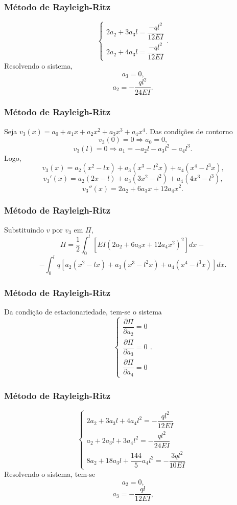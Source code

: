 \documentclass{beamer}
\begin{document}
	\begin{frame}
		\frametitle{Método de Rayleigh-Ritz}
		\justify
		
		$$
			\begin{cases}
				2a_2+3a_3l=\dfrac{-ql^2}{12EI}\\[10pt]
				2a_2+4a_3l=\dfrac{-ql^2}{12EI}
			\end{cases}
			\text{.}
		$$
		\pause
		Resolvendo o sistema,
		$$
			a_3=0
			\text{,}
		$$
		\pause
		$$
			a_2=-\frac{ql^2}{24EI}
			\text{.}
		$$
	\end{frame}
	
	\begin{frame}
		\frametitle{Método de Rayleigh-Ritz}
		\justify
		
		Seja $v_3(x)=a_0 + a_1 x + a_2 x^2 + a_3 x^3 + a_4 x^4$. \pause Das condições de contorno
		$$
			v_3(0)=0\Longrightarrow a_0 = 0\text{,}
		$$
		\pause
		$$
			v_3(l)=0\Longrightarrow a_1 = -a_2l - a_3l^2 - a_4l^3\text{.}
		$$
		\pause
		Logo, 
		$$v_3(x)=a_2(x^2-lx)+a_3(x^3-l^2x) + a_4(x^4-l^3x)\text{,}$$
		\pause 
		$$v_3'(x)=a_2(2x-l)+a_3(3x^2-l^2)+a_4(4x^3-l^3)\text{,}$$
		\pause
		$$v_3''(x)=2a_2 + 6a_3x + 12a_4x^2\text{.}$$
	\end{frame}
	
	\begin{frame}
		\frametitle{Método de Rayleigh-Ritz}
		\justify
		
		Substituindo $v$ por $v_3$ em $\Pi$,
		$$
			\Pi = \frac{1}{2} \int_0^l \left [
				EI(2a_2+6a_3x+12a_4x^2)^2
			\right ] dx
			-
		$$
		$$
			-
			\int_0^l q \left [
				a_2(x^2 - lx)
				+
				a_3(x^3 - l^2x)
				+
				a_4(x^4 - l^3x)
			\right ] dx
			\text{.}
		$$
	\end{frame}
	
	\begin{frame}
		\frametitle{Método de Rayleigh-Ritz}
		\justify
		Da condição de estacionariedade, tem-se o sistema
		$$
			\begin{cases}
				\dfrac{\partial \Pi}{\partial a_2}=0\\[10pt]
				\dfrac{\partial \Pi}{\partial a_3}=0\\[10pt]
				\dfrac{\partial \Pi}{\partial a_4}=0
			\end{cases}
			\text{.}
		$$
	\end{frame}
	
	\begin{frame}
		\frametitle{Método de Rayleigh-Ritz}
		\justify
		
		$$
			\begin{cases}
				2a_2 + 3a_3l + 4a_4l^2 = -\dfrac{ql^2}{12EI}\\[10pt]
				a_2 + 2a_3 l + 3a_4 l^2 = - \dfrac{ql^2}{24EI}\\[10pt]
				8a_2 + 18a_3 l + \dfrac{144}{5} a_4 l^2 =-\dfrac{3ql^2}{10EI}
			\end{cases}
		$$
		\pause
		Resolvendo o sistema, tem-se
		$$
			a_2 = 0
			\text{,}
		$$
		\pause
		$$
			a_3 = -\frac{ql}{12EI}
			\text{,}
		$$
	\end{frame}
	
\end{document}
